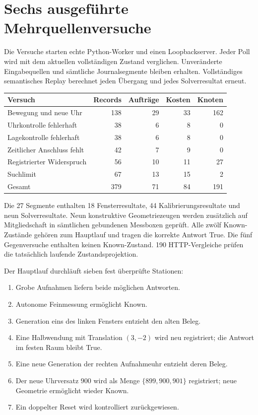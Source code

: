 \documentclass[11pt,a4paper]{article}
\newcommand{\nextsection}[2]{\clearpage{\color{accent}\small\textsf{#1}}\section{#2}}
\begin{document}
\nextsection{81 / PROZESSNACHWEISE}{Sechs ausgeführte Mehrquellenversuche}
Die Versuche starten echte Python-Worker und einen Loopbackserver.
Jeder Poll wird mit dem aktuellen vollständigen Zustand verglichen.
Unveränderte Eingabequellen und sämtliche Journalsegmente bleiben
erhalten. Vollständiges semantisches Replay berechnet jeden Übergang
und jedes Solverresultat erneut.

\begin{tabularx}{\linewidth}{@{}Yrrrr@{}}\toprule
Versuch & Records & Aufträge & Kosten & Knoten\\\midrule
Bewegung und neue Uhr & 138 & 29 & 33 & 162\\
Uhrkontrolle fehlerhaft & 38 & 6 & 8 & 0\\
Lagekontrolle fehlerhaft & 38 & 6 & 8 & 0\\
Zeitlicher Anschluss fehlt & 42 & 7 & 9 & 0\\
Registrierter Widerspruch & 56 & 10 & 11 & 27\\
Suchlimit & 67 & 13 & 15 & 2\\\midrule
Gesamt & 379 & 71 & 84 & 191\\\bottomrule
\end{tabularx}

Die 27 Segmente enthalten 18 Fensterresultate, 44
Kalibrierungsresultate und neun Solverresultate. Neun konstruktive
Geometriezeugen werden zusätzlich auf Mitgliedschaft in sämtlichen
gebundenen Messboxen geprüft. Alle zwölf Known-Zustände gehören
zum Hauptlauf und tragen die korrekte Antwort True. Die fünf
Gegenversuche enthalten keinen Known-Zustand. 190 HTTP-Vergleiche
prüfen die tatsächlich laufende Zustandsprojektion.

Der Hauptlauf durchläuft sieben fest überprüfte Stationen:
\begin{enumerate}
\item Grobe Aufnahmen liefern beide möglichen Antworten.
\item Autonome Feinmessung ermöglicht Known.
\item Generation eins des linken Fensters entzieht den alten Beleg.
\item Eine Halbwendung mit Translation $(3,-2)$ wird neu registriert;
      die Antwort im festen Raum bleibt True.
\item Eine neue Generation der rechten Aufnahmeuhr entzieht deren Beleg.
\item Der neue Uhrversatz $900$ wird als Menge $\{899,900,901\}$
      registriert; neue Geometrie ermöglicht wieder Known.
\item Ein doppelter Reset wird kontrolliert zurückgewiesen.
\end{enumerate}
\end{document}
